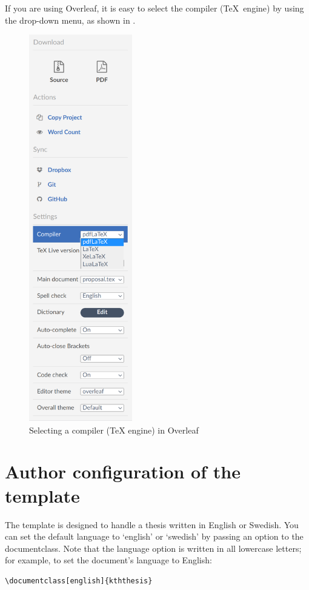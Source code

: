 \documentclass[main.tex]{subfiles}
\begin{document}
If you are using Overleaf, it is easy to select the compiler (\ie \TeX\ engine) by using the drop-down menu, as shown in .
\begin{figure}[!ht]
  \begin{center}
    \includegraphics[width=0.40\textwidth]{README_notes/selecting-engine-in-overleaf.png}
  \end{center}
  \caption{Selecting a compiler (\ie TeX engine) in Overleaf}
  \label{fig:selectingTeXEngine}
\end{figure}
\FloatBarrier


\section{Author configuration of the template}
\label{sec:authorConfigs}
The template is designed to handle a thesis written in English or Swedish.
You can set the default language to `english' or `swedish' by passing an option to the documentclass. Note that the language option is written in all lowercase letters; for example, to set the document's language to English:
\begin{lstlisting}[style=latexExampleForAuthors]
\documentclass[english]{kththesis}
\end{lstlisting}
\end{document}
